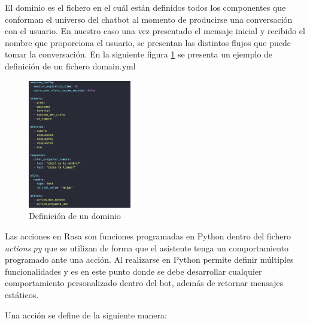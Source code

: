
El dominio es el fichero en el cuál están definidos todos los componentes que conforman el universo del chatbot al momento de producirse una conversación con el usuario. En nuestro caso una vez presentado el mensaje inicial y recibido el nombre que proporciona el usuario, se presentan las distintos flujos que puede tomar la conversación. En la siguiente figura \ref{fig:rasa_domain} se presenta un ejemplo de definición de un fichero domain.yml

\begin{figure}[H]
    \centering
    \includegraphics[width=0.4\textwidth]{include/capturas/RasaDomain.png}
    \caption{Definición de un dominio}
    \label{fig:rasa_domain}
\end{figure}



Las acciones en Rasa son funciones programadas en Python dentro del fichero \textit{actions.py} que se utilizan de forma que el asistente tenga un comportamiento programado ante una acción. Al realizarse en Python permite definir múltiples funcionalidades y es en este punto donde se debe desarrollar cualquier comportamiento personalizado dentro del bot, además de retornar mensajes estáticos.

Una acción se define de la siguiente manera:

